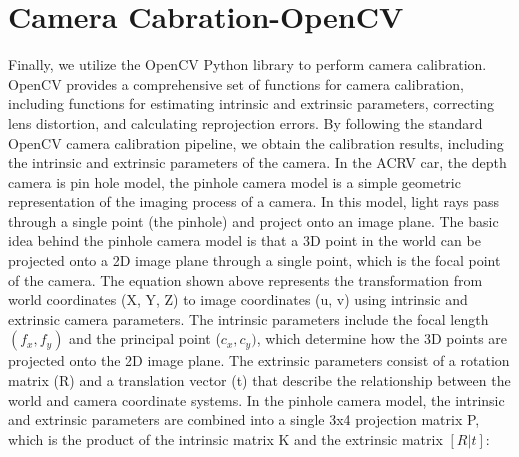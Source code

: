 \documentclass{article}
\begin{document}
\section*{Camera Cabration-OpenCV}
Finally, we utilize the OpenCV Python library to perform camera calibration. 
OpenCV provides a comprehensive set of functions for camera calibration, 
including functions for estimating intrinsic and extrinsic parameters, 
correcting lens distortion, and calculating reprojection errors. 
By following the standard OpenCV camera calibration pipeline, 
we obtain the calibration results, 
including the intrinsic and extrinsic parameters of the camera.
\newline
In the ACRV car, the depth camera is pin hole model, 
the pinhole camera model is a simple geometric representation 
of the imaging process of a camera. In this model, 
light rays pass through a single point (the pinhole) 
and project onto an image plane. 
The basic idea behind the pinhole camera model 
is that a 3D point in the world can be projected onto a 
2D image plane through a single point, which is the focal point of the camera.
\newline
The equation shown above represents the transformation from world coordinates 
(X, Y, Z) to image coordinates (u, v) using intrinsic and extrinsic camera parameters. 
The intrinsic parameters include the focal length $(f_x, f_y)$ and the principal point ($c_x, c_y)$, 
which determine how the 3D points are projected onto the 2D image plane. 
The extrinsic parameters consist of a rotation matrix (R) and 
a translation vector (t) that describe the relationship 
between the world and camera coordinate systems.
\newline
In the pinhole camera model, 
the intrinsic and extrinsic parameters are combined into 
a single 3x4 projection matrix P, which is the product 
of the intrinsic matrix K and the extrinsic matrix $[R | t]$:
\end{document}
